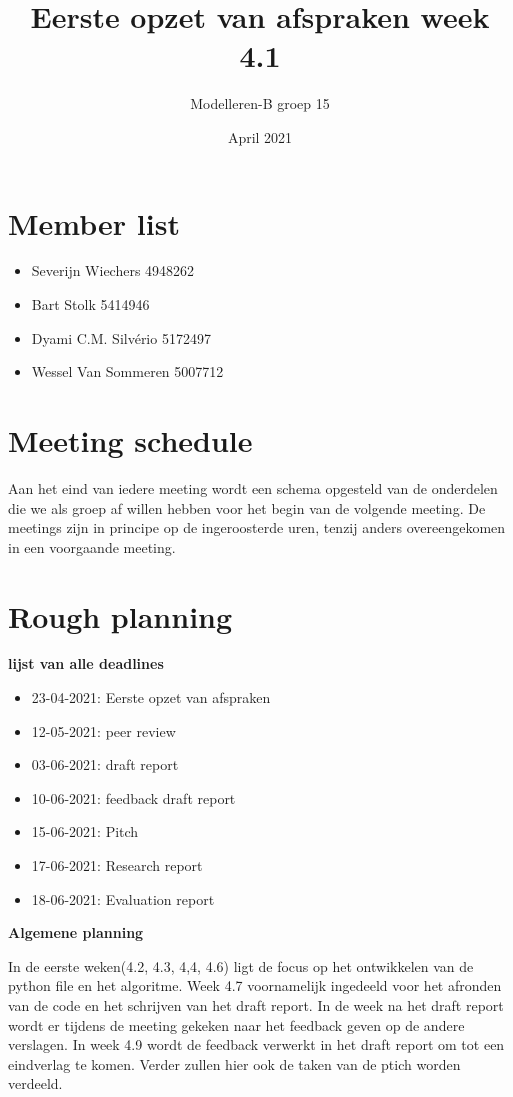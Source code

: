 \documentclass{article}
\title{Eerste opzet van afspraken week 4.1}
\author{Modelleren-B groep 15}
\date{April 2021}
\begin{document}
\maketitle

\section*{Member list}

\begin{itemize}
    \item Severijn Wiechers 4948262
    \item Bart Stolk 5414946
    \item Dyami C.M. Silvério 5172497
    \item Wessel Van Sommeren 5007712
\end{itemize}


\section*{Meeting schedule} 

Aan het eind van iedere meeting wordt een schema opgesteld van de onderdelen die we als groep af willen hebben voor het begin van de volgende meeting. De meetings zijn in principe op de ingeroosterde uren, tenzij anders overeengekomen in een voorgaande meeting. 




\section*{Rough planning}
\textbf{lijst van alle deadlines}
\begin{itemize}
    \item 23-04-2021: Eerste opzet van afspraken
    \item 12-05-2021: peer review
    \item 03-06-2021: draft report
    \item 10-06-2021: feedback draft report
    \item 15-06-2021: Pitch
    \item 17-06-2021: Research report
    \item 18-06-2021: Evaluation report 
\end{itemize}
\textbf{Algemene planning}

In de eerste weken(4.2, 4.3, 4,4, 4.6) ligt de focus op het ontwikkelen van de python file en het algoritme. Week 4.7 voornamelijk ingedeeld voor het afronden van de code en het schrijven van het draft report. In de week na het draft report wordt er tijdens de meeting gekeken naar het feedback geven op de andere verslagen. In week 4.9 wordt de feedback verwerkt in het draft report om tot een eindverlag te komen. Verder zullen hier ook de taken van de ptich worden verdeeld.
\end{document}
